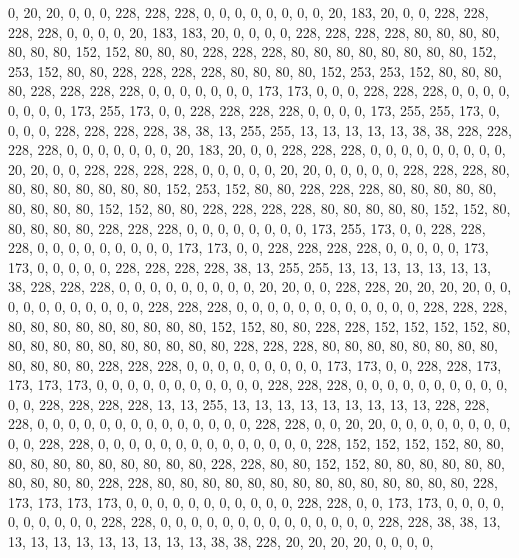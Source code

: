 {	0,   20,  20,  0,   0,   0,   228, 228, 228, 0,   0,   0,   0,   0,   0,   0,   0,   20,  183, 20,  0,   0,   228, 228, 228, 228, 0,   0,   0,   0,   20,  183, 183, 20,  0,   0,   0,   0,   228, 228, 228, 228, 80,  80,  80,  80,  80,  80,  80,  152, 152, 80,  80,  80,  228, 228, 228, 80,  80,  80,  80,  80,  80,  80,  80,  152, 253, 152, 80,  80,  228, 228, 228, 228, 80,  80,  80,  80,  152, 253, 253, 152, 80,  80,  80,  80,  228, 228, 228, 228, 0,   0,   0,   0,   0,   0,   0,   173, 173, 0,   0,   0,   228, 228, 228, 0,   0,   0,   0,   0,   0,   0,   0,   173, 255, 173, 0,   0,   228, 228, 228, 228, 0,   0,   0,   0,   173, 255, 255, 173, 0,   0,   0,   0,   228, 228, 228, 228, 38,  38,  13,  255, 255, 13,  13,  13,  13,  13,  38,  38,  228, 228, 228, 228, 0,   0,   0,   0,   0,   0,   
	0,   20,  183, 20,  0,   0,   228, 228, 228, 0,   0,   0,   0,   0,   0,   0,   0,   0,   20,  20,  0,   0,   228, 228, 228, 228, 0,   0,   0,   0,   0,   20,  20,  0,   0,   0,   0,   0,   228, 228, 228, 80,  80,  80,  80,  80,  80,  80,  80,  152, 253, 152, 80,  80,  228, 228, 228, 80,  80,  80,  80,  80,  80,  80,  80,  80,  152, 152, 80,  80,  228, 228, 228, 228, 80,  80,  80,  80,  80,  152, 152, 80,  80,  80,  80,  80,  228, 228, 228, 0,   0,   0,   0,   0,   0,   0,   0,   173, 255, 173, 0,   0,   228, 228, 228, 0,   0,   0,   0,   0,   0,   0,   0,   0,   173, 173, 0,   0,   228, 228, 228, 228, 0,   0,   0,   0,   0,   173, 173, 0,   0,   0,   0,   0,   228, 228, 228, 228, 38,  13,  255, 255, 13,  13,  13,  13,  13,  13,  13,  38,  228, 228, 228, 0,   0,   0,   0,   0,   0,   0,   
	0,   0,   20,  20,  0,   0,   228, 228, 20,  20,  20,  20,  0,   0,   0,   0,   0,   0,   0,   0,   0,   0,   0,   228, 228, 228, 0,   0,   0,   0,   0,   0,   0,   0,   0,   0,   0,   0,   228, 228, 228, 80,  80,  80,  80,  80,  80,  80,  80,  80,  152, 152, 80,  80,  228, 228, 152, 152, 152, 152, 80,  80,  80,  80,  80,  80,  80,  80,  80,  80,  80,  228, 228, 228, 80,  80,  80,  80,  80,  80,  80,  80,  80,  80,  80,  80,  228, 228, 228, 0,   0,   0,   0,   0,   0,   0,   0,   0,   173, 173, 0,   0,   228, 228, 173, 173, 173, 173, 0,   0,   0,   0,   0,   0,   0,   0,   0,   0,   0,   228, 228, 228, 0,   0,   0,   0,   0,   0,   0,   0,   0,   0,   0,   0,   228, 228, 228, 228, 13,  13,  255, 13,  13,  13,  13,  13,  13,  13,  13,  13,  228, 228, 228, 0,   0,   0,   0,   0,   0,   0,   
	0,   0,   0,   0,   0,   0,   0,   228, 228, 0,   0,   20,  20,  0,   0,   0,   0,   0,   0,   0,   0,   0,   0,   228, 228, 0,   0,   0,   0,   0,   0,   0,   0,   0,   0,   0,   0,   0,   0,   228, 152, 152, 152, 152, 80,  80,  80,  80,  80,  80,  80,  80,  80,  80,  80,  228, 228, 80,  80,  152, 152, 80,  80,  80,  80,  80,  80,  80,  80,  80,  80,  228, 228, 80,  80,  80,  80,  80,  80,  80,  80,  80,  80,  80,  80,  80,  80,  228, 173, 173, 173, 173, 0,   0,   0,   0,   0,   0,   0,   0,   0,   0,   0,   228, 228, 0,   0,   173, 173, 0,   0,   0,   0,   0,   0,   0,   0,   0,   0,   228, 228, 0,   0,   0,   0,   0,   0,   0,   0,   0,   0,   0,   0,   0,   0,   228, 228, 38,  38,  13,  13,  13,  13,  13,  13,  13,  13,  13,  13,  38,  38,  228, 20,  20,  20,  20,  0,   0,   0,   0,   
}
